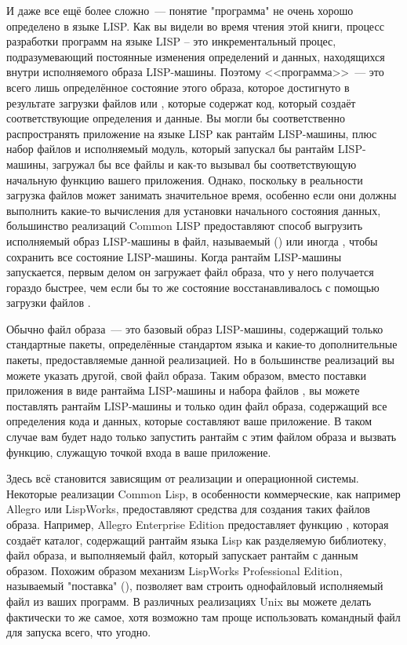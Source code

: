 И даже все ещё более сложно~--- понятие "программа" не очень хорошо определено в языке
LISP. Как вы видели во время чтения этой книги, процесс разработки программ на языке LISP
-- это инкрементальный процес, подразумевающий постоянные изменения определений и данных,
находящихся внутри исполняемого образа LISP-машины. Поэтому <<программа>>~--- это всего
лишь определённое состояние этого образа, которое достигнуто в результате загрузки файлов
 или , которые содержат код, который создаёт соответствующие
определения и данные. Вы могли бы соответственно распространять приложение на языке LISP
как рантайм LISP-машины, плюс набор файлов  и исполняемый модуль, который
запускал бы рантайм LISP-машины, загружал бы все файлы  и как-то вызывал бы
соответствующую начальную функцию вашего приложения. Однако, поскольку в реальности
загрузка файлов  может занимать значительное время, особенно если они должны
выполнить какие-то вычисления для установки начального состояния данных, большинство
реализаций Common LISP предоставляют способ выгрузить исполняемый образ LISP-машины в
файл, называемый  () или иногда , чтобы
сохранить все состояние LISP-машины. Когда рантайм LISP-машины запускается, первым делом
он загружает файл образа, что у него получается гораздо быстрее, чем если бы то же
состояние восстанавливалось с помощью загрузки файлов .

Обычно файл образа~--- это базовый образ LISP-машины, содержащий только стандартные пакеты,
определённые стандартом языка и какие-то дополнительные пакеты, предоставляемые данной
реализацией. Но в большинстве реализаций вы можете указать другой, свой файл образа. Таким
образом, вместо поставки приложения в виде рантайма LISP-машины и набора файлов
, вы можете поставлять рантайм LISP-машины и только один файл образа,
содержащий все определения кода и данных, которые составляют ваше приложение. В таком
случае вам будет надо только запустить рантайм с этим файлом образа и вызвать функцию,
служащую точкой входа в ваше приложение.

Здесь всё становится зависящим от реализации и операционной системы. Некоторые реализации
Common Lisp, в особенности коммерческие, как например Allegro или LispWorks, предоставляют
средства для создания таких файлов образа. Например, Allegro Enterprise Edition
предоставляет функцию , которая создаёт каталог,
содержащий рантайм языка Lisp как разделяемую библиотеку, файл образа, и выполняемый файл,
который запускает рантайм с данным образом. Похожим образом механизм LispWorks
Professional Edition, называемый "поставка" (), позволяет вам строить
однофайловый исполняемый файл из ваших программ. В различных реализациях Unix вы можете
делать фактически то же самое, хотя возможно там проще использовать командный файл для
запуска всего, что угодно.

